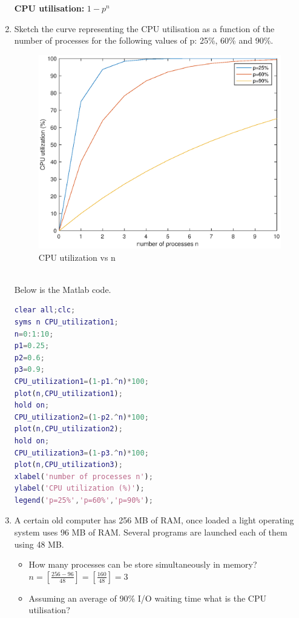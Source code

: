 \documentclass{article}
\begin{document}
\begin{spacing}{2.0}
\begin{enumerate}
\textbf{CPU utilisation:}
$1-p^n$
\item Sketch the curve representing the CPU utilisation as a function of the number of processes for the following values of p: 25\%, 60\% and 90\%.\\
\begin{figure}[!h]
	\begin{center}
	\includegraphics[scale=0.9]{multiprogramming.eps}
	\caption{CPU utilization vs n}
	\end{center}
\end{figure}\\
Below is the Matlab code.
\begin{lstlisting}[language=Matlab]
clear all;clc;
syms n CPU_utilization1;
n=0:1:10;
p1=0.25;
p2=0.6;
p3=0.9;
CPU_utilization1=(1-p1.^n)*100;
plot(n,CPU_utilization1);
hold on;
CPU_utilization2=(1-p2.^n)*100;
plot(n,CPU_utilization2);
hold on;
CPU_utilization3=(1-p3.^n)*100;
plot(n,CPU_utilization3);
xlabel('number of processes n');
ylabel('CPU utilization (%)');
legend('p=25%','p=60%','p=90%');
\end{lstlisting}
\item A certain old computer has 256 MB of RAM, once loaded a light operating system uses 96 MB of RAM. Several programs are launched each of them using 48 MB.
\begin{itemize}
    \item How many processes can be store simultaneously in memory?\\
    $n=[\frac{256-96}{48}]=[\frac{160}{48}]=3$
    \item Assuming an average of 90\% I/O waiting time what is the CPU utilisation?\\

\end{itemize}
\end{enumerate}
\end{spacing}
\end{document}
